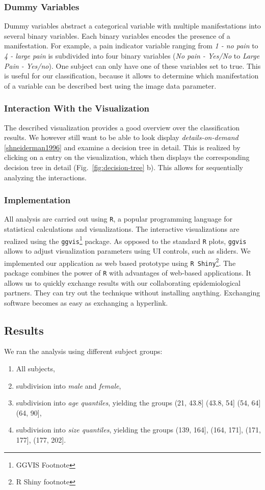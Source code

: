\documentclass[a4paper,twoside]{style/article}
\newcommand{\com}[1]{\textcolor{orange}{\uline{#1}}}
\begin{document}
\subsubsection{Dummy Variables}
Dummy variables abstract a categorical variable with multiple manifestations into several binary variables.
Each binary variables encodes the presence of a manifestation.
For example, a pain indicator variable ranging from \emph{1 - no pain} to \emph{4 - large pain} is subdivided into four binary variables (\emph{No pain - Yes/No} to \emph{Large Pain - Yes/no}).
One subject can only have one of these variables set to true.
This is useful for our classification, because it allows to determine which manifestation of a variable can be described best using the image data parameter.
\subsubsection{Interaction With the Visualization}
The described visualization provides a good overview over the classification results.
We however still want to be able to look display \emph{details-on-demand} \ref{shneiderman1996} and examine a decision tree in detail.
This is realized by clicking on a entry on the visualization, which then displays the corresponding decision tree in detail (Fig.~\ref{fig:decision-tree} b).
This allows for sequentially analyzing the interactions.
\subsubsection{Implementation}
All analysis are carried out using \texttt{R}, a popular programming language for statistical calculations and visualizations.
The interactive visualizations are realized using the \texttt{ggvis}\footnote{GGVIS Footnote} package.
As opposed to the standard \texttt{R} plots, \texttt{ggvis} allows to adjust visualization parameters using UI controls, such as sliders.
We implemented our application as web based prototype using \texttt{R Shiny}\footnote{R Shiny footnote}.
The package combines the power of \texttt{R} with advantages of web-based applications.
It allows us to quickly exchange results with our collaborating epidemiological partners.
They can try out the technique without installing anything.
Exchanging software becomes as easy as exchanging a hyperlink.
\subsection{Results}
We ran the analysis using different subject groups:
\begin{enumerate}
	\item All subjects,
	\item subdivision into \emph{male} and \emph{female},
	\item subdivision into \emph{age quantiles}, yielding the groups (21, 43.8] (43.8, 54] (54, 64] (64, 90],
	\item subdivision into \emph{size quantiles}, yielding the groups (139, 164], (164, 171], (171, 177], (177, 202].
\end{enumerate}
\end{document}
